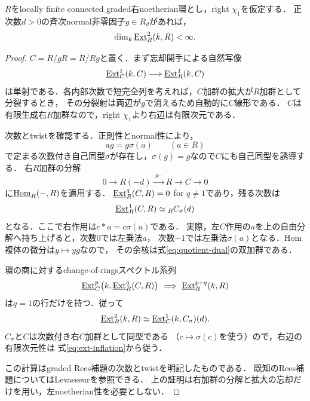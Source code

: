\documentclass[11pt,a4paper]{ltjsarticle}
\begin{document}
\begin{lemma}[正則normal元と第二Bass空間]\label{lem:normal-bass}
$R$をlocally finite connected graded右noetherian環とし，right $\chi_1$を仮定する．
正次数$d>0$の斉次normal非零因子$g\in R_d$があれば，
\[
 \dim_k\underline{\operatorname{Ext}}^{2}_R(k,R)<\infty.
\]
\end{lemma}
\begin{proof}
$C=R/gR=R/Rg$と置く．まず忘却関手による自然写像
\begin{equation}\label{eq:ext-inflation}
 \underline{\operatorname{Ext}}^{1}_C(k,C)\longrightarrow
 \underline{\operatorname{Ext}}^{1}_R(k,C)
\end{equation}
は単射である．各内部次数で短完全列を考えれば，$C$加群の拡大が$R$加群として分裂するとき，
その分裂射は両辺が$g$で消えるため自動的に$C$線形である．
$C$は有限生成右$R$加群なので，right $\chi_1$より右辺は有限次元である．

次数とtwistを確認する．正則性とnormal性により，
\[
 ag=g\sigma(a)\qquad(a\in R)
\]
で定まる次数付き自己同型$\sigma$が存在し，$\sigma(g)=g$なので$C$にも自己同型を誘導する．
右$R$加群の分解
\[
 0\longrightarrow R(-d)\xrightarrow{\;g\cdot\;}R\longrightarrow C\longrightarrow0
\]
に$\underline{\operatorname{Hom}}_R(-,R)$を適用する．
$\underline{\operatorname{Ext}}^{q}_R(C,R)=0$ for $q\ne1$であり，残る次数は
\begin{equation}\label{eq:quotient-dual}
 \underline{\operatorname{Ext}}^{1}_R(C,R)\simeq {}_R C_{\sigma}(d)
\end{equation}
となる．ここで右作用は$c*a=c\sigma(a)$である．
実際，左$C$作用の$a$を上の自由分解へ持ち上げると，次数0では左乗法$a$，
次数$-1$では左乗法$\sigma(a)$となる．Hom複体の微分は$y\mapsto yg$なので，
その余核は式\eqref{eq:quotient-dual}の双加群である．

環の商に対するchange-of-ringsスペクトル系列
\[
 \underline{\operatorname{Ext}}^{p}_C
 \bigl(k,\underline{\operatorname{Ext}}^{q}_R(C,R)\bigr)
 \ \Longrightarrow\ \underline{\operatorname{Ext}}^{p+q}_R(k,R)
\]
は$q=1$の行だけを持つ．従って
\begin{equation}\label{eq:rees}
 \underline{\operatorname{Ext}}^{2}_R(k,R)
 \simeq\underline{\operatorname{Ext}}^{1}_C(k,C_{\sigma})(d).
\end{equation}
$C_{\sigma}$と$C$は次数付き右$C$加群として同型である
（$c\mapsto\sigma(c)$を使う）ので，右辺の有限次元性は
式\eqref{eq:ext-inflation}から従う．

この計算はgraded Rees補題の次数とtwistを明記したものである．
既知のRees補題についてはLevasseur\cite[Proposition 3.4(b), p.~282]{LevasseurNormal}を参照できる．
上の証明は右加群の分解と拡大の忘却だけを用い，左noetherian性を必要としない．
\end{proof}
\end{document}
